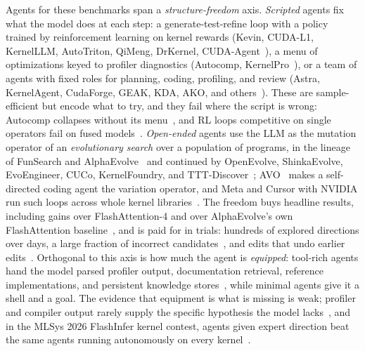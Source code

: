 Agents for these benchmarks span a \emph{structure-freedom} axis.
\emph{Scripted} agents fix what the model does at each step: a generate-test-refine loop with a policy trained by reinforcement learning on kernel rewards (Kevin, CUDA-L1, KernelLLM, AutoTriton, QiMeng, DrKernel, CUDA-Agent~\cite{baronio2025kevin,li2025cudal1,kernelllm2025,li2025autotriton,zhu2026qimeng,drkernel,cudaagent2026}), a menu of optimizations keyed to profiler diagnostics (Autocomp, KernelPro~\cite{hong2025autocomp,kernelpro2026}), or a team of agents with fixed roles for planning, coding, profiling, and review (Astra, KernelAgent, CudaForge, GEAK, KDA, AKO, and others~\cite{wei2025astra,kernelagent,cudaforge,wang2025geak,kda,han2026kda,ako,kernelskill2026,luo2026houmao,sun2026kernelclaw}).
These are sample-efficient but encode what to try, and they fail where the script is wrong: Autocomp collapses without its menu~\cite{hong2025autocomp}, and RL loops competitive on single operators fail on fused models~\cite{drkernel,zhu2026qimeng,cudaagent2026}.
\emph{Open-ended} agents use the LLM as the mutation operator of an \emph{evolutionary search} over a population of programs, in the lineage of FunSearch and AlphaEvolve~\cite{romeraparedes2024funsearch,alphaevolve} and continued by OpenEvolve, ShinkaEvolve, EvoEngineer, CUCo, KernelFoundry, and TTT-Discover~\cite{openevolve,lange2025shinkaevolve,guo2025evoengineer,cuco2026,wiedemann2026kernelfoundry,yuksekgonul2026tttdiscover}; AVO~\cite{chen2026avo} makes a self-directed coding agent the variation operator, and Meta and Cursor with NVIDIA run such loops across whole kernel libraries~\cite{liao2025kernelevolve,kernelevolve,cursor2026multiagent}.
The freedom buys headline results, including gains over FlashAttention-4 and over AlphaEvolve's own FlashAttention baseline~\cite{chen2026avo,alphaevolve}, and is paid for in trials: hundreds of explored directions over days, a large fraction of incorrect candidates~\cite{guo2025evoengineer,cuco2026}, and edits that undo earlier edits~\cite{pelleriti2026evotrace}.
Orthogonal to this axis is how much the agent is \emph{equipped}: tool-rich agents hand the model parsed profiler output, documentation retrieval, reference implementations, and persistent knowledge stores~\cite{chen2026avo,han2026kda}, while minimal agents give it a shell and a goal.
The evidence that equipment is what is missing is weak; profiler and compiler output rarely supply the specific hypothesis the model lacks~\cite{redko2026priorknowledge}, and in the MLSys 2026 FlashInfer kernel contest, agents given expert direction beat the same agents running autonomously on every kernel~\cite{mlsys26contest,shui2026harness}.


